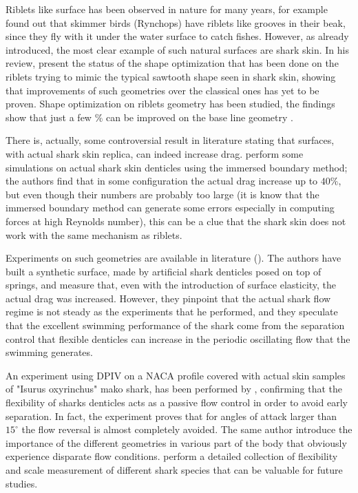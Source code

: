 Riblets like surface has been observed in nature for many years, for example \citet{Martin2016riblets} found out that skimmer birds (Rynchops) have riblets like grooves in their beak, since they fly with it under the water surface to catch fishes.
However, as already introduced, the most clear example of such natural surfaces are shark skin.
In his review, \citet{dean2010shark} present the status of the shape optimization that has been done on the riblets trying to mimic the typical sawtooth shape seen in shark skin, showing that improvements of such geometries over the classical ones has yet to be proven.
Shape optimization on riblets geometry has been studied, the findings show that just a few $\%$ can be improved on the base line geometry \citet{bechert1997experiments}.

There is, actually, some controversial result in literature stating that surfaces, with actual shark skin replica, can indeed increase drag.
\citet{boomsma2016direct} perform some simulations on actual shark skin denticles using the immersed boundary method; the authors find that in some configuration the actual drag increase up to $40\%$, but even though their numbers are probably too large (it is know that the immersed boundary method can generate some errors especially in computing forces at high Reynolds number), this can be a clue that the shark skin does not work with the same mechanism as riblets.

Experiments on such geometries are available in literature (\citet{bechert1997natural}).
The authors have built a synthetic surface, made by artificial shark denticles posed on top of springs, and measure that, even with the introduction of surface elasticity, the actual drag was increased.
However, they pinpoint that the actual shark flow regime is not steady as the experiments that he performed, and they speculate that the excellent swimming performance of the shark come from the separation control that flexible denticles can increase in the periodic oscillating flow that the swimming generates.

An experiment using DPIV on a NACA profile covered with actual skin samples of "Isurus oxyrinchus" mako shark, has been performed by \citet{lang2014SharkControl}, confirming that the flexibility of sharks denticles acts as a passive flow control in order to avoid early separation.
In fact, the experiment proves that for angles of attack larger than $15^{\circ}$ the flow reversal is almost completely avoided.
The same author introduce the importance of the different geometries in various part of the body that obviously experience disparate flow conditions.
\citet{motta2012Shark} perform a detailed collection of flexibility and scale measurement of different shark species that can be valuable for future studies.

